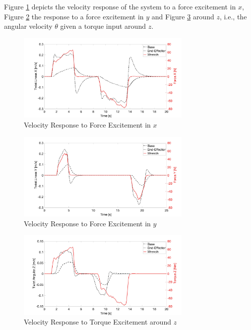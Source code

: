 Figure \ref{pics:test18_x} depicts the velocity response of the system to a force excitement in $x$, Figure \ref{pics:test18_y} the response to a force excitement in $y$ and Figure \ref{pics:test18_theta} around $z$, i.e., the angular velocity $\theta$ given a torque input around $z$.

\begin{figure}
   \centering
   \includegraphics[width=0.75\textwidth]{images/test18_x.jpg}
   \caption{Velocity Response to Force Excitement in $x$}
   \label{pics:test18_x}
\end{figure}

\begin{figure}
   \centering
   \includegraphics[width=0.75\textwidth]{images/test18_y.jpg}
   \caption{Velocity Response to Force Excitement in $y$}
   \label{pics:test18_y}
\end{figure}

\begin{figure}
   \centering
   \includegraphics[width=0.75\textwidth]{images/test18_theta.jpg}
   \caption{Velocity Response to Torque Excitement around $z$}
   \label{pics:test18_theta}
\end{figure}

